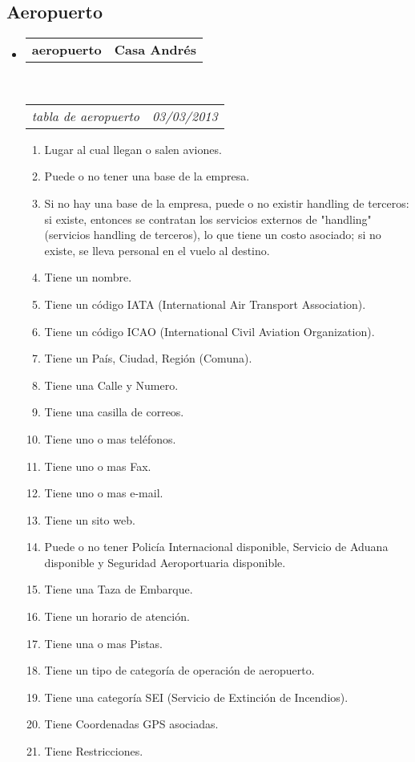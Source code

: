 \documentclass[10pt,letterpaper]{article}
\makeatletter
\newcommand{\headerrow}[2]
{\begin{tabular*}{\linewidth}{l@{\extracolsep{\fill}}r}
	#1 &
	#2 \\
\end{tabular*}}
\makeatother
\begin{document}
\subsection*{Aeropuerto}

\begin{itemize}
	\parskip=0.1em

	\item
	\headerrow
		{\textbf{aeropuerto}}
		{\textbf{Casa Andrés}}
	\\
	\headerrow
		{\emph{tabla de aeropuerto}}
		{\emph{03/03/2013}}
	\begin{enumerate}
		\item Lugar al cual llegan o salen aviones.
		\item Puede o no tener una base de la empresa.
		\item Si no hay una base de la empresa, puede o no existir handling de terceros: si existe, entonces se contratan los servicios externos de "handling" (servicios handling de terceros), lo que tiene un costo asociado; si no existe, se lleva personal en el vuelo al destino.
		\item Tiene un nombre.
		\item Tiene un código IATA (International Air Transport Association).
		\item Tiene un código ICAO (International Civil Aviation Organization).
		\item Tiene un País, Ciudad, Región (Comuna).
		\item Tiene una Calle y Numero.
		\item Tiene una casilla de correos.
		\item Tiene uno o mas teléfonos.
		\item Tiene uno o mas Fax.
		\item Tiene uno o mas e-mail.
		\item Tiene un sito web.
		\item Puede o no tener Policía Internacional disponible, Servicio de Aduana disponible y Seguridad Aeroportuaria disponible.
		\item Tiene una Taza de Embarque.
		\item Tiene un horario de atención.
		\item Tiene una o mas Pistas.
		\item Tiene un tipo de categoría de operación de aeropuerto.
		\item Tiene una categoría SEI (Servicio de Extinción de Incendios).
		\item Tiene Coordenadas GPS asociadas.
		\item Tiene Restricciones.
	\end{enumerate}

\end{itemize}
\end{document}
